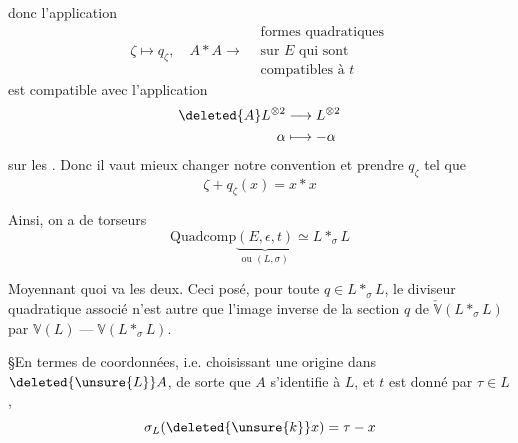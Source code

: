 donc l'application
\[
\zeta\longmapsto q_\zeta,\quad A*A\longrightarrow
\begin{aligned}&\text{formes quadratiques}\\&\text{sur $E$ qui sont}\\&\text{compatibles à $t$}\end{aligned}
\]
est compatible avec l'application
\[
\begin{aligned}
\deleted{A}L^{\otimes 2}&\longrightarrow L^{\otimes 2}\\
\alpha&\longmapsto-\alpha
\end{aligned}
\]
sur les  . Donc il
vaut mieux changer notre convention
et  prendre $q_\zeta$ tel que
\[
\zeta+q_\zeta(x)=x*x
\]

Ainsi, on a  de torseurs
\[
\mathrm{Quadcomp}\underbrace{(E,\epsilon,t)}_{\text{ou }(L,\sigma)}\simeq L*_{\sigma}L
\]

Moyennant quoi  va  les
deux. Ceci posé, pour toute $q\in L*_\sigma L$,
le diviseur quadratique associé n'est
autre que l'image inverse de la section
$q$ de $\check{\mathbb V}(L*_\sigma L)$ par $\mathbb V(L)\mathbin{\text{---}}\mathbb V(L*_\sigma L)$.

\S En termes de coordonnées,
i.e. choisissant une origine dans $\deleted{\unsure{L}}A$,
de sorte que $A$ s'identifie à $L$,
et $t$ est  donné par $\tau\in L$,
\[
\sigma_L(\deleted{\unsure{k}}x)=\tau-x
\]
